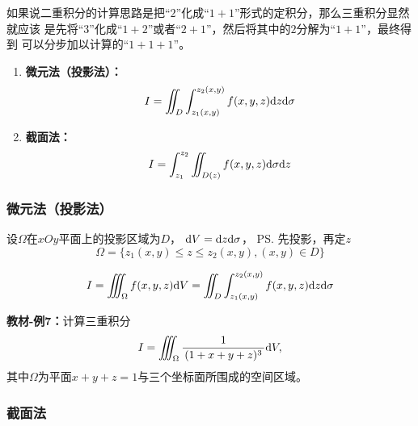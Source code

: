 如果说二重积分的计算思路是把“$2$”化成“$1+1$”形式的定积分，那么三重积分显然就应该
是先将“$3$”化成“$1+2$”或者“$2+1$”，然后将其中的$2$分解为“$1+1$”，最终得到
可以分步加以计算的“$1+1+1$”。

\begin{enumerate}
  \item {\bf 微元法（投影法）：}
  $$I=\iint_D\int_{z_1(x,y)}^{z_2(x,y)}f(x,y,z)\mathrm{d} z\mathrm{d}\sigma$$
  \item {\bf 截面法：}
  $$I=\int_{z_1}^{z_2}\iint_{D(z)}f(x,y,z)\mathrm{d}\sigma \mathrm{d} z$$
\end{enumerate}

\subsubsection{微元法（投影法）}

设$\Omega$在$xOy$平面上的投影区域为$D$， $\mathrm{d} V=\mathrm{d} z\mathrm{d}\sigma$， \ps{先投影，再定$z$}
$$\Omega=\{z_1(x,y)\leq z\leq z_2(x,y), (x,y)\in D\}$$

\begin{center}
\end{center}

$${I=\iiint_{\Omega}f(x,y,z)\mathrm{d}
V=\iint_D\int_{z_1(x,y)}^{z_2(x,y)}f(x,y,z)\mathrm{d} z\mathrm{d}\sigma}$$

{\bf 教材-例7：}计算三重积分
$$I=\iiint_{\Omega}\displaystyle\frac{\,{1}\,}{\,{(1+x+y+z)^3}\,}\mathrm{d} V,$$
其中$\Omega$为平面$x+y+z=1$与三个坐标面所围成的空间区域。

\subsubsection{截面法}

